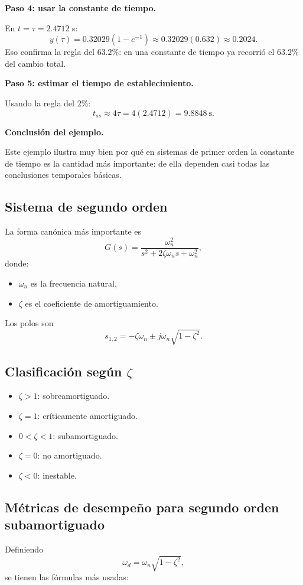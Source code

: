 \documentclass[11pt]{article}
\begin{document}
\textbf{Paso 4: usar la constante de tiempo.}

En $t=\tau=2.4712$ s:
\[
y(\tau)=0.32029\left(1-e^{-1}\right)\approx 0.32029(0.632)\approx 0.2024.
\]
Eso confirma la regla del $63.2\%$: en una constante de tiempo ya recorri\'o el $63.2\%$ del cambio total.

\textbf{Paso 5: estimar el tiempo de establecimiento.}

Usando la regla del $2\%$:
\[
t_{ss}\approx 4\tau=4(2.4712)=9.8848~\text{s}.
\]

\textbf{Conclusi\'on del ejemplo.}

Este ejemplo ilustra muy bien por qu\'e en sistemas de primer orden la constante de tiempo es la cantidad m\'as importante: de ella dependen casi todas las conclusiones temporales b\'asicas.

\subsection{Sistema de segundo orden}
La forma can\'onica m\'as importante es
\begin{equation}
G(s)=\frac{\omega_n^2}{s^2+2\zeta \omega_n s+\omega_n^2},
\end{equation}
donde:
\begin{itemize}
\item $\omega_n$ es la frecuencia natural,
\item $\zeta$ es el coeficiente de amortiguamiento.
\end{itemize}

Los polos son
\begin{equation}
s_{1,2}=-\zeta \omega_n \pm j\omega_n\sqrt{1-\zeta^2}.
\end{equation}

\subsection{Clasificaci\'on seg\'un $\zeta$}
\begin{itemize}
\item $\zeta>1$: sobreamortiguado.
\item $\zeta=1$: cr\'iticamente amortiguado.
\item $0<\zeta<1$: subamortiguado.
\item $\zeta=0$: no amortiguado.
\item $\zeta<0$: inestable.
\end{itemize}

\subsection{M\'etricas de desempe\~no para segundo orden subamortiguado}
Definiendo
\[
\omega_d=\omega_n\sqrt{1-\zeta^2},
\]
se tienen las f\'ormulas m\'as usadas:
\end{document}
